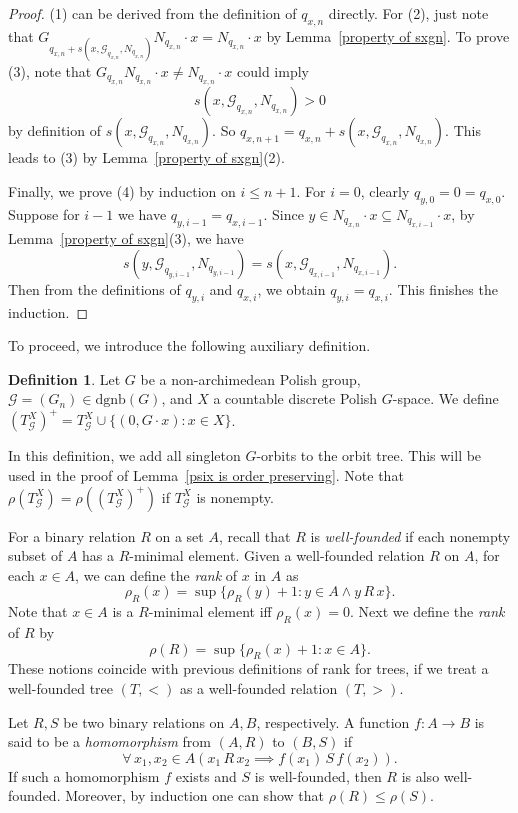 \documentclass[11pt]{amsart}
\theoremstyle{definition}
\newtheorem{definition}[theorem]{Definition}
\theoremstyle{remark}
\numberwithin{equation}{section}
\def\dgnb{{\mathrm{dgnb}}}
\def\otr#1#2{T_{\mathcal{#1}}^{#2}}
\begin{document}
\begin{proof}
    (1) can be derived from the definition of $q_{x,n}$ directly. For (2), just note that $G_{q_{x,n}+s(x,\mathcal{G}_{q_{x,n}},N_{q_{x,n}})}N_{q_{x,n}}\cdot x=N_{q_{x,n}}\cdot x$ by Lemma~\ref{property of sxgn}. To prove (3), note that $G_{q_{x,n}}N_{q_{x,n}}\cdot x\neq N_{q_{x,n}}\cdot x$ could imply
    $$s(x,\mathcal{G}_{q_{x,n}},N_{q_{x,n}})>0$$
    by definition of $s(x,\mathcal{G}_{q_{x,n}},N_{q_{x,n}})$. So $q_{x,n+1}=q_{x,n}+s(x,\mathcal{G}_{q_{x,n}},N_{q_{x,n}})$. This leads to (3) by Lemma~\ref{property of sxgn}(2).

    Finally, we prove (4) by induction on $i\leq n+1$. For $i=0$, clearly $q_{y,0}=0=q_{x,0}$. Suppose for $i-1$ we have $q_{y,i-1}=q_{x,i-1}$. Since $y\in N_{q_{x,n}}\cdot x\subseteq N_{q_{x,i-1}}\cdot x$, by Lemma~\ref{property of sxgn}(3), we have
    $$s(y,\mathcal{G}_{q_{y,i-1}},N_{q_{y,i-1}})=s(x,\mathcal{G}_{q_{x,i-1}},N_{q_{x,i-1}}).$$
    Then from the definitions of $q_{y,i}$ and $q_{x,i}$, we obtain $q_{y,i}=q_{x,i}$. This finishes the induction.
\end{proof}

To proceed, we introduce the following auxiliary definition.
\begin{definition}
    Let $G$ be a non-archimedean Polish group, $\mathcal{G}=(G_n)\in\dgnb(G)$, and $X$ a countable discrete Polish $G$-space. We define $(T_\mathcal{G}^X)^+=T_\mathcal{G}^X\cup\{(0,G\cdot x):x\in X\}$.
\end{definition}
In this definition, we add all singleton $G$-orbits to the orbit tree. This will be used in the proof of Lemma~\ref{psix is order preserving}. Note that $\rho(\otr{G}{X})=\rho((\otr{G}{X})^+)$ if $\otr{G}{X}$ is nonempty.

For a binary relation $R$ on a set $A$, recall that $R$ is {\it well-founded} if each nonempty subset of $A$ has a $R$-minimal element. Given a well-founded relation $R$ on $A$, for each $x\in A$, we can define the {\it rank} of $x$ in $A$ as
$$\rho_R(x)=\sup\{\rho_R(y)+1:y\in A\land y\,R\,x\}.$$
Note that $x\in A$ is a $R$-minimal element iff $\rho_R(x)=0$. Next we define the {\it rank} of $R$ by
$$\rho(R)=\sup\{\rho_R(x)+1:x\in A\}.$$
These notions coincide with previous definitions of rank for trees, if we treat a well-founded tree $(T,<)$ as a well-founded relation $(T,>)$.

Let $R,S$ be two binary relations on $A,B$, respectively. A function $f:A\to B$ is said to be a {\it homomorphism} from $(A,R)$ to $(B,S)$ if
$$\forall\,x_1,x_2\in A\left(x_1\,R\,x_2\implies f(x_1)\,S\,f(x_2)\right).$$
If such a homomorphism $f$ exists and $S$ is well-founded, then $R$ is also well-founded. Moreover, by induction one can show that $\rho(R)\leq\rho(S)$.
\end{document}
